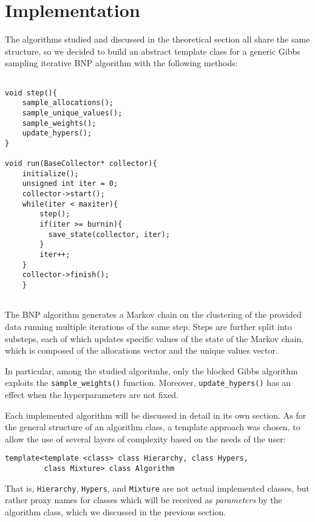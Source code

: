 \chapter{Implementation}

The algorithms studied and discussed in the theoretical section all share the same structure, so we decided to build an abstract template class for a generic Gibbs sampling iterative BNP algorithm with the following methods:

\begin{verbatim}

void step(){
    sample_allocations();
    sample_unique_values();
    sample_weights();
    update_hypers();
}

void run(BaseCollector* collector){
    initialize();
    unsigned int iter = 0;
    collector->start();
    while(iter < maxiter){
        step();
        if(iter >= burnin){
          save_state(collector, iter);
        }
        iter++;
    }
    collector->finish();
    }
    
\end{verbatim}

The BNP algorithm generates a Markov chain on the clustering of the provided data running multiple iterations of the same step.
Steps are further split into substeps, each of which updates specific values of the state of the Markov chain, which is composed of the allocations vector and the unique values vector.


In particular, among the studied algoritmhs, only the blocked Gibbs algorithm exploits the \verb|sample_weights()| function. Moreover, \verb|update_hypers()| has an effect  when the hyperparameters are not fixed.


Each implemented algorithm will be discussed in detail in its own section.
As for the general structure of an algorithm class, a template approach was chosen, to allow the use of several layers of complexity based on the needs of the user:
\begin{verbatim}
template<template <class> class Hierarchy, class Hypers,
         class Mixture> class Algorithm
\end{verbatim}
That is, \verb|Hierarchy|, \verb|Hypers|, and \verb|Mixture| are not actual implemented classes, but rather proxy names for classes which will be received as \emph{parameters} by the algorithm class, which we discussed in the previous section.


